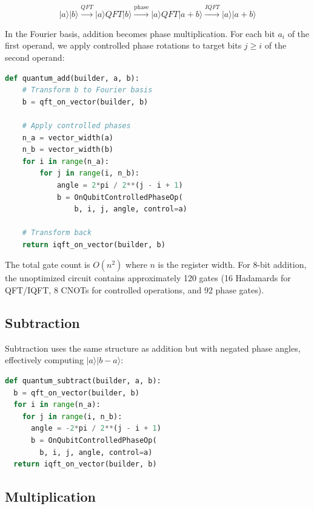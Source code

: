 \documentclass[a4paper,twocolumn]{article}
\begin{document}
\begin{equation}
  |a\rangle|b\rangle \xrightarrow{QFT} |a\rangle QFT|b\rangle \xrightarrow{\text{phase}} |a\rangle QFT|a+b\rangle
  \xrightarrow{IQFT} |a\rangle|a+b\rangle
\end{equation}

In the Fourier basis, addition becomes phase multiplication. For each bit $a_i$ of the first
operand, we apply controlled phase rotations to target bits $j \ge i$ of the second operand:

\begin{lstlisting}[language=Python, caption={Addition Implementation}]
def quantum_add(builder, a, b):
    # Transform b to Fourier basis
    b = qft_on_vector(builder, b)
    
    # Apply controlled phases
    n_a = vector_width(a)
    n_b = vector_width(b)
    for i in range(n_a):
        for j in range(i, n_b):
            angle = 2*pi / 2**(j - i + 1)
            b = OnQubitControlledPhaseOp(
                b, i, j, angle, control=a)
    
    # Transform back
    return iqft_on_vector(builder, b)
\end{lstlisting}

The total gate count is $O(n^2)$ where $n$ is the register width. For 8-bit addition, the unoptimized circuit
contains approximately 120 gates (16 Hadamards for QFT/IQFT, 8 CNOTs for controlled operations, and 92 phase gates).

\subsection{Subtraction}

Subtraction uses the same structure as addition but with negated phase angles, effectively computing $|a\rangle|b-a\rangle$:

\begin{lstlisting}[language=Python, caption={Subtraction via Negated Phases}]
def quantum_subtract(builder, a, b):
  b = qft_on_vector(builder, b)
  for i in range(n_a):
    for j in range(i, n_b):
      angle = -2*pi / 2**(j - i + 1)
      b = OnQubitControlledPhaseOp(
        b, i, j, angle, control=a)
  return iqft_on_vector(builder, b)
\end{lstlisting}

\subsection{Multiplication}
\end{document}
